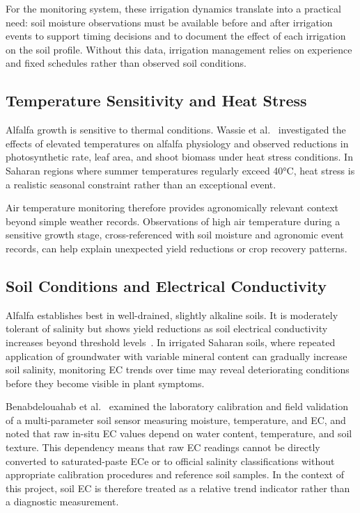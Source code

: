 For the monitoring system, these irrigation dynamics translate into a practical
need: soil moisture observations must be available before and after irrigation
events to support timing decisions and to document the effect of each irrigation
on the soil profile. Without this data, irrigation management relies on experience
and fixed schedules rather than observed soil conditions.

\subsection{Temperature Sensitivity and Heat Stress}
\label{subsec:alfalfa-heat}

Alfalfa growth is sensitive to thermal conditions. Wassie et
al.~\cite{wassie2019heat_stress_alfalfa} investigated the effects of elevated
temperatures on alfalfa physiology and observed reductions in photosynthetic rate,
leaf area, and shoot biomass under heat stress conditions. In Saharan regions
where summer temperatures regularly exceed 40°C, heat stress is a realistic
seasonal constraint rather than an exceptional event.

Air temperature monitoring therefore provides agronomically relevant context
beyond simple weather records. Observations of high air temperature during a
sensitive growth stage, cross-referenced with soil moisture and agronomic event
records, can help explain unexpected yield reductions or crop recovery patterns.

\subsection{Soil Conditions and Electrical Conductivity}
\label{subsec:alfalfa-soil}

Alfalfa establishes best in well-drained, slightly alkaline soils. It is
moderately tolerant of salinity but shows yield reductions as soil electrical
conductivity increases beyond threshold
levels~\cite{nrcs1999soil_electrical_conductivity}. In irrigated Saharan soils,
where repeated application of groundwater with variable mineral content can
gradually increase soil salinity, monitoring EC trends over time may reveal
deteriorating conditions before they become visible in plant symptoms.

Benabdelouahab et al.~\cite{benabdelouahab2019sensor_calibration_5te} examined the
laboratory calibration and field validation of a multi-parameter soil sensor
measuring moisture, temperature, and EC, and noted that raw in-situ EC values
depend on water content, temperature, and soil texture. This dependency means
that raw EC readings cannot be directly converted to saturated-paste ECe or to
official salinity classifications without appropriate calibration procedures
and reference soil samples. In the context of this project, soil EC is therefore
treated as a relative trend indicator rather than a diagnostic measurement.

